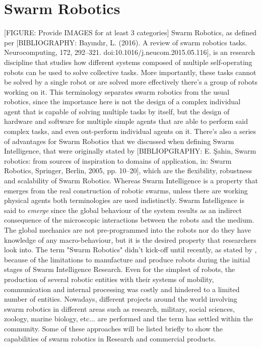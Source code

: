 \section{Swarm Robotics}
[FIGURE: Provide IMAGES for at least 3 categories]
Swarm Robotics, as defined per [BIBLIOGRAPHY: Bayındır, L. (2016). A review of swarm robotics tasks. Neurocomputing, 172, 292–321. doi:10.1016/j.neucom.2015.05.116],  is an research discipline that studies how different systems composed of multiple self-operating robots can be used to solve collective tasks. More importantly, these tasks cannot be solved by a single robot or are solved more effectively there's a group of robots working on it. This terminology separates swarm robotics from the usual robotics, since the importance here is not the design of a complex individual agent that is capable of solving multiple tasks by itself, but the design of hardware and software for multiple simple agents that are able to perform said complex tasks, and even out-perform individual agents on it. There's also a series of advantages for Swarm Robotics that we discussed when defining Swarm Intelligence, that were originally stated by [BIBLIOPGRAPHY: E. Şahin, Swarm robotics: from sources of inspiration to domains of application, in: Swarm Robotics, Springer, Berlin, 2005, pp. 10–20], which are the flexibility, robustness and scalability of Swarm Robotics. 
	Whereas Swarm Intelligence is a property that emerges from the real construction of robotic swarms, unless there are working physical agents both terminologies are used indistinctly. Swarm Intelligence is said to \emph{emerge} since the global behaviour of the system results as an indirect consequence of the microscopic interactions between the robots and the medium. The global mechanics are not pre-programmed into the robots nor do they have knowledge of any macro-behaviour, but it is the desired property that researchers look into.
	The term "Swarm Robotics" didn't kick-off until recently, as stated by \citep{C_gerardo_beni}, because of the limitations to manufacture and produce robots during the initial stages of Swarm Intelligence Research. Even for the simplest of robots, the production of several robotic entities with their systems of mobility, communication and internal processing was costly and hindered to a limited number of entities. Nowadays, different projects around the world involving swarm robotics in different areas such as research, military, social sciences, zoology, marine biology, etc...\cite{D_Swarm_Applications} are performed and the term has settled within the community. Some of these approaches will be listed briefly to show the capabilities of swarm robotics in Research and commercial products.
	
